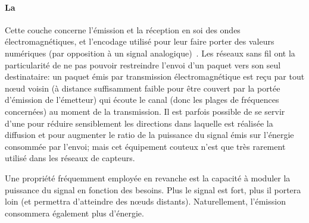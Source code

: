            \paragraph{La }
Cette couche concerne l'émission et la réception en soi des ondes électromagnétiques, et l'encodage utilisé pour leur faire porter des valeurs numériques (par opposition à un signal analogique)~\cite{TW10}.
Les réseaux sans fil ont la particularité de ne pas pouvoir restreindre l'envoi d'un paquet vers son seul destinataire: un paquet émis par transmission électromagnétique est reçu par tout nœud voisin (\cad à distance suffisamment faible pour être couvert par la portée d'émission de l'émetteur) qui écoute le canal (donc les plages de fréquences concernées) au moment de la transmission.
Il est parfois possible de se servir d'une  pour réduire sensiblement les directions dans laquelle est réalisée la diffusion et pour augmenter le ratio de la puissance du signal émis sur l'énergie consommée par l'envoi; mais cet équipement couteux n'est que très rarement utilisé dans les réseaux de capteurs.

Une propriété fréquemment employée en revanche est la capacité à moduler la puissance du signal en fonction des besoins.
Plus le signal est fort, plus il portera loin (et permettra d'atteindre des nœuds distants).
Naturellement, l'émission consommera également plus d'énergie.

